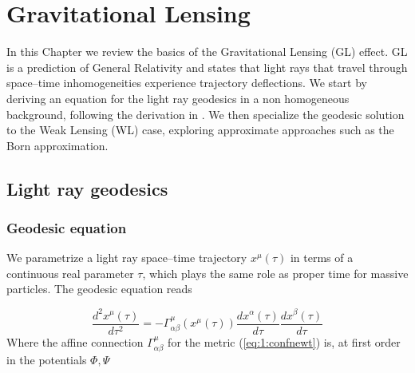 
\chapter{Gravitational Lensing}
\lhead[\fancyplain{}{\thepage}]{\fancyplain{}{\rightmark}}
 \thispagestyle{plain}
\setlength{\parindent}{10mm}


In this Chapter we review the basics of the Gravitational Lensing (GL) effect. GL is a prediction of General Relativity and states that light rays that travel through space--time inhomogeneities experience trajectory deflections. We start by deriving an equation for the light ray geodesics in a non homogeneous background, following the derivation in \citep{Dodelson-C11}. We then specialize the geodesic solution to the Weak Lensing (WL) case, exploring approximate approaches such as the Born approximation.

\section{Light ray geodesics}

\subsection{Geodesic equation} 

We parametrize a light ray space--time trajectory $x^\mu(\tau)$ in terms of a continuous real parameter $\tau$, which plays the same role as proper time for massive particles. The geodesic equation reads 

\begin{equation}
\label{eq:2:geodesic}
\frac{d^2 x^\mu(\tau)}{d\tau^2} = -\Gamma_{\alpha\beta}^\mu(x^\mu(\tau)) \frac{d x^\alpha(\tau)}{d\tau}\frac{d x^\beta(\tau)}{d\tau}
\end{equation}
%
Where the affine connection $\Gamma_{\alpha\beta}^\mu$ for the metric (\ref{eq:1:confnewt}) is, at first order in the potentials $\Phi,\Psi$

